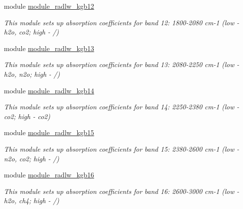 \begin{DoxyCompactItemize}
module \hyperlink{namespacemodule__radlw__kgb12}{module\+\_\+radlw\+\_\+kgb12}
\begin{DoxyCompactList}\small\item\em This module sets up absorption coefficients for band 12\+: 1800-\/2080 cm-\/1 (low -\/ h2o, co2; high -\/ /) \end{DoxyCompactList}\item 
module \hyperlink{namespacemodule__radlw__kgb13}{module\+\_\+radlw\+\_\+kgb13}
\begin{DoxyCompactList}\small\item\em This module sets up absorption coefficients for band 13\+: 2080-\/2250 cm-\/1 (low -\/ h2o, n2o; high -\/ /) \end{DoxyCompactList}\item 
module \hyperlink{namespacemodule__radlw__kgb14}{module\+\_\+radlw\+\_\+kgb14}
\begin{DoxyCompactList}\small\item\em This module sets up absorption coefficients for band 14\+: 2250-\/2380 cm-\/1 (low -\/ co2; high -\/ co2) \end{DoxyCompactList}\item 
module \hyperlink{namespacemodule__radlw__kgb15}{module\+\_\+radlw\+\_\+kgb15}
\begin{DoxyCompactList}\small\item\em This module sets up absorption coefficients for band 15\+: 2380-\/2600 cm-\/1 (low -\/ n2o, co2; high -\/ /) \end{DoxyCompactList}\item 
module \hyperlink{namespacemodule__radlw__kgb16}{module\+\_\+radlw\+\_\+kgb16}
\begin{DoxyCompactList}\small\item\em This module sets up absorption coefficients for band 16\+: 2600-\/3000 cm-\/1 (low -\/ h2o, ch4; high -\/ /) \end{DoxyCompactList}\end{DoxyCompactItemize}
